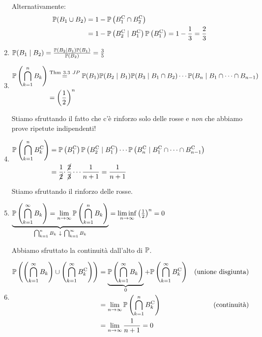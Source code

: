 \begin{enumerate}
	Alternativamente:
	\begin{align*}
		\mathbb{P}( B_{1} \cup B_{2}) & =1-\mathbb{P}\left( B_{1}^{\mathrm{C}} \cap B_{2}^{\mathrm{C}}\right)\\
		 & =1-\mathbb{P}\left( B_{2}^{\mathrm{C}} \mid B_{1}^{\mathrm{C}}\right)\mathbb{P}\left( B_{1}^{\mathrm{C}}\right) =1-\frac{1}{3} =\frac{2}{3}
	\end{align*}
	\item $\mathbb{P}( B_{1} \mid B_{2}) =\frac{\mathbb{P}( B_{2} \mid B_{1})\mathbb{P}( B_{1})}{\mathbb{P}( B_{2})} =\frac{3}{5}$
	\item $
	\begin{aligned}
		\mathbb{P}\left(\bigcap\limits _{k=1}^{n} B_{k}\right) & \overset{\text{Thm} \ 3.3\ JP}{=}\mathbb{P}( B_{1})\mathbb{P}( B_{2} \mid B_{1})\mathbb{P}( B_{3} \mid B_{1} \cap B_{2}) \cdots \mathbb{P}( B_{n} \mid B_{1} \cap \cdots \cap B_{n-1})\\
		 & =\left(\frac{1}{2}\right)^{n}
	\end{aligned}$
	
	Stiamo sfruttando il fatto che c'è rinforzo solo delle rosse e \textit{non} che abbiamo prove ripetute indipendenti!
	\item $
	\begin{aligned}
		\mathbb{P}\left(\bigcap\limits _{k=1}^{n} B_{k}^{\mathrm{C}}\right) & =\mathbb{P}\left( B_{1}^{\mathrm{C}}\right)\mathbb{P}\left( B_{2}^{\mathrm{C}} \mid B_{1}^{\mathrm{C}}\right) \cdots \mathbb{P}\left( B_{n}^{\mathrm{C}} \mid B_{1}^{\mathrm{C}} \cap \cdots \cap B_{n-1}^{\mathrm{C}}\right)\\
		 & =\frac{1}{\cancel{2}} \cdotp \frac{\cancel{2}}{\cancel{3}} \cdots \frac{1}{n+1} =\frac{1}{n+1}
	\end{aligned}$

	Stiamo sfruttando il rinforzo delle rosse.
	\item $\underbrace{\mathbb{P}\left(\bigcap\limits _{k=1}^{\infty } B_{k}\right) =\lim\limits _{n\rightarrow \infty }\mathbb{P}\left(\bigcap\limits _{k=1}^{n} B_{k}\right)}_{\bigcap _{k=1}^{n} B_{k} \ \downarrow \ \bigcap _{k=1}^{\infty } B_{k}} =\liminf\limits _{n\rightarrow \infty }\left(\frac{1}{2}\right)^{n} =0$

	Abbiamo sfruttato la continuità dall'alto di $\mathbb{P}$.
	\item $
	\begin{aligned}
		\mathbb{P}\left(\left(\bigcap\limits _{k=1}^{\infty } B_{k}\right) \cup \left(\bigcap\limits _{k=1}^{\infty } B_{k}^{\mathrm{C}}\right)\right) & =\underbrace{\mathbb{P}\left(\bigcap\limits _{k=1}^{\infty } B_{k}\right)}_{0} +\mathbb{P}\left(\bigcap\limits _{k=1}^{\infty } B_{k}^{\mathrm{C}}\right) & \text{(unione disgiunta)}\\
		 & =\lim\limits _{n\rightarrow \infty }\mathbb{P}\left(\bigcap\limits _{k=1}^{n} B_{k}^{\mathrm{C}}\right) & \text{(continuità)}\\
		 & =\lim\limits _{n\rightarrow \infty }\frac{1}{n+1} =0 & 
	\end{aligned}$
\end{enumerate}

\Soluzione
